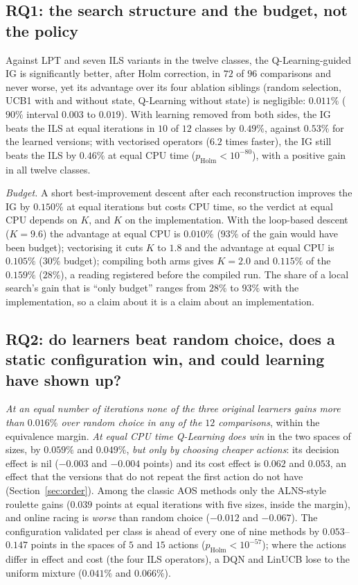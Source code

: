 \subsection{RQ1: the search structure and the budget, not the policy}
\label{sec:rq1}
Against LPT and seven ILS variants in the twelve classes, the Q-Learning-guided IG is significantly better, after Holm correction, in $72$ of $96$ comparisons and never worse, yet its advantage over its four ablation siblings (random selection, UCB1 with and without state, Q-Learning without state) is negligible: $0.011\%$ ($90\%$ interval $0.003$ to $0.019$). With learning removed from both sides, the IG beats the ILS at equal iterations in $10$ of $12$ classes by $0.49\%$, against $0.53\%$ for the learned versions; with vectorised operators ($6.2$ times faster), the IG still beats the ILS by $0.46\%$ at equal CPU time ($p_{\mathrm{Holm}}<10^{-80}$), with a positive gain in all twelve classes.

\emph{Budget.} A short best-improvement descent after each reconstruction improves the IG by $0.150\%$ at equal iterations but costs CPU time, so the verdict at equal CPU depends on $K$, and $K$ on the implementation. With the loop-based descent ($K=9.6$) the advantage at equal CPU is $0.010\%$ ($93\%$ of the gain would have been budget); vectorising it cuts $K$ to $1.8$ and the advantage at equal CPU is $0.105\%$ ($30\%$ budget); compiling both arms gives $K=2.0$ and $0.115\%$ of the $0.159\%$ ($28\%$), a reading registered before the compiled run. The share of a local search's gain that is ``only budget'' ranges from $28\%$ to $93\%$ with the implementation, so a claim about it is a claim about an implementation.

\subsection{RQ2: do learners beat random choice, does a static configuration win, and could learning have shown up?}
\label{sec:rq2}
\emph{At an equal number of iterations none of the three original learners gains more than $0.016\%$ over random choice in any of the $12$ comparisons}, within the equivalence margin. \emph{At equal CPU time Q-Learning does win} in the two spaces of sizes, by $0.059\%$ and $0.049\%$, \emph{but only by choosing cheaper actions}: its decision effect is nil ($-0.003$ and $-0.004$ points) and its cost effect is $0.062$ and $0.053$, an effect that the versions that do not repeat the first action do not have (Section~\ref{sec:order}). Among the classic AOS methods only the ALNS-style roulette gains ($0.039$ points at equal iterations with five sizes, inside the margin), and online racing is \emph{worse} than random choice ($-0.012$ and $-0.067$). The configuration validated per class is ahead of every one of nine methods by $0.053$--$0.147$ points in the spaces of $5$ and $15$ actions ($p_{\mathrm{Holm}}<10^{-57}$); where the actions differ in effect and cost (the four ILS operators), a DQN and LinUCB lose to the uniform mixture ($0.041\%$ and $0.066\%$).

